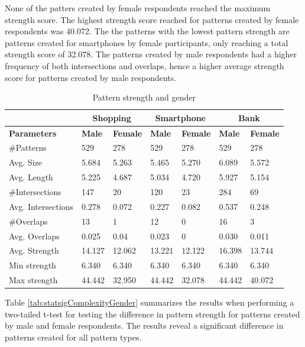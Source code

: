     None of the patters created by female respondents reached the maximum strength score. The highest strength score reached for patterns created by female respondents was 40.072. The the patterns with the lowest pattern strength are patterns created for smartphones by female participants, only reaching a total strength score of 32.078. The patterns created by male respondents had a higher frequency of both intersections and overlaps, hence a higher average strength score for patterns created by male respondents. 

    \begin{table}[H]
      \centering
      \begin{tabular}{l || l | l || l | l || l | l }
        \hline
         & \multicolumn{2}{c||}{\bf Shopping} & \multicolumn{2}{c||}{\bf Smartphone} &\multicolumn{2}{c}{\bf Bank} \\ \hline
        {\bf Parameters}   & {\bf Male} & {\bf Female} & {\bf Male} & {\bf Female} & {\bf Male} & {\bf Female}\\ \hline
        \#Patterns         & 529    & 278    & 529    & 278    & 529    & 278    \\
        Avg. Size          & 5.684  & 5.263  & 5.465  & 5.270  & 6.089  & 5.572  \\
        Avg. Length        & 5.225  & 4.687  & 5.034  & 4.720  & 5.927  & 5.154  \\
        \#Intersections    & 147    & 20     & 120    & 23     & 284    & 69     \\
        Avg. Intersections & 0.278  & 0.072  & 0.227  & 0.082  & 0.537  & 0.248  \\
        \#Overlaps         & 13     & 1      & 12     & 0      & 16     & 3      \\
        Avg. Overlaps      & 0.025  & 0.04   & 0.023  & 0      & 0.030  & 0.011  \\ \hline
        Avg. Strength      & 14.127 & 12.062 & 13.221 & 12.122 & 16.398 & 13.744 \\ 
        Min strength       & 6.340  & 6.340  & 6.340  & 6.340  & 6.340  & 6.340  \\
        Max strength       & 44.442 & 32.950  & 44.442 & 32.078 & 44.442 & 40.072 \\ \hline
      \end{tabular}
      \caption{Pattern strength and gender}
      \label{tab:gendertrength}
    \end{table}

    Table \ref{tab:statsigComplexityGender} summarizes the results when performing a two-tailed t-test for testing the difference in pattern strength for patterns created by male and female respondents. The results reveal a significant difference in patterns created for all pattern types.

